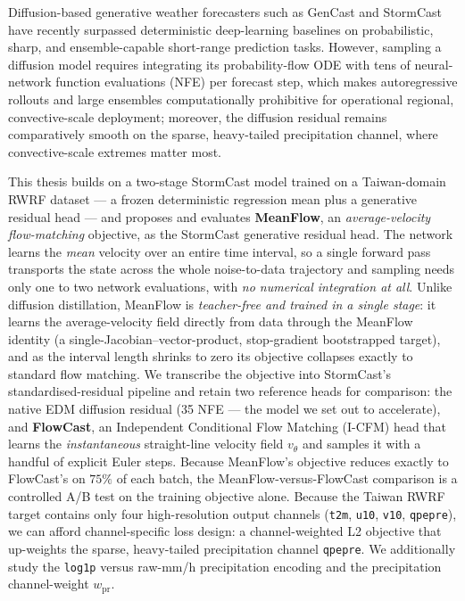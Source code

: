 \begin{abstract*}

Diffusion-based generative weather forecasters such as GenCast and StormCast have recently surpassed deterministic deep-learning baselines on probabilistic, sharp, and ensemble-capable short-range prediction tasks. However, sampling a diffusion model requires integrating its probability-flow ODE with tens of neural-network function evaluations (NFE) per forecast step, which makes autoregressive rollouts and large ensembles computationally prohibitive for operational regional, convective-scale deployment; moreover, the diffusion residual remains comparatively smooth on the sparse, heavy-tailed precipitation channel, where convective-scale extremes matter most.

This thesis builds on a two-stage StormCast model trained on a Taiwan-domain RWRF dataset --- a frozen deterministic regression mean plus a generative residual head --- and proposes and evaluates \textbf{MeanFlow}, an \emph{average-velocity flow-matching} objective, as the StormCast generative residual head. The network learns the \emph{mean} velocity over an entire time interval, so a single forward pass transports the state across the whole noise-to-data trajectory and sampling needs only one to two network evaluations, with \emph{no numerical integration at all}. Unlike diffusion distillation, MeanFlow is \emph{teacher-free and trained in a single stage}: it learns the average-velocity field directly from data through the MeanFlow identity (a single-Jacobian--vector-product, stop-gradient bootstrapped target), and as the interval length shrinks to zero its objective collapses exactly to standard flow matching. We transcribe the objective into StormCast's standardised-residual pipeline and retain two reference heads for comparison: the native EDM diffusion residual (35 NFE --- the model we set out to accelerate), and \textbf{FlowCast}, an Independent Conditional Flow Matching (I-CFM) head that learns the \emph{instantaneous} straight-line velocity field $v_\theta$ and samples it with a handful of explicit Euler steps. Because MeanFlow's objective reduces exactly to FlowCast's on $75\%$ of each batch, the MeanFlow-versus-FlowCast comparison is a controlled A/B test on the training objective alone. Because the Taiwan RWRF target contains only four high-resolution output channels (\texttt{t2m}, \texttt{u10}, \texttt{v10}, \texttt{qpepre}), we can afford channel-specific loss design: a channel-weighted L2 objective that up-weights the sparse, heavy-tailed precipitation channel \texttt{qpepre}. We additionally study the \texttt{log1p} versus raw-mm/h precipitation encoding and the precipitation channel-weight $w_{\text{pr}}$.


\end{abstract*}
